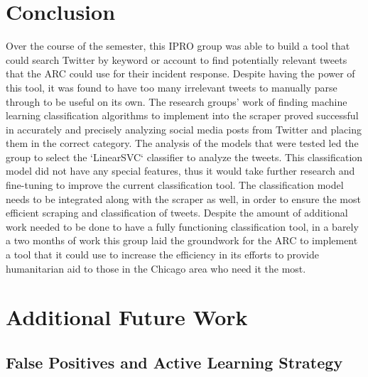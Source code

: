 \documentclass[titlepage, 12pt]{article}
\begin{document}
\section{Conclusion}
\hspace{0.5 cm}Over the course of the semester, this IPRO group was able to build a tool that could search Twitter by keyword or account to find potentially relevant tweets that the ARC could use for their incident response. Despite having the power of this tool, it was found to have too many irrelevant tweets to manually parse through to be useful on its own. The research groups' work of finding machine learning classification algorithms to implement into the scraper proved successful in accurately and precisely analyzing social media posts from Twitter and placing them in the correct category. The analysis of the models that were tested led the group to select the `LinearSVC` classifier to analyze the tweets. This classification model did not have any special features, thus it would take further research and fine-tuning to improve the current classification tool. The classification model needs to be integrated along with the scraper as well, in order to ensure the most efficient scraping and classification of tweets. Despite the amount of additional work needed to be done to have a fully functioning classification tool, in a barely a two months of work this group laid the groundwork for the ARC to implement a tool that it could use to increase the efficiency in its efforts to provide humanitarian aid to those in the Chicago area who need it the most.

\section{Additional Future Work}

\subsection{False Positives and Active Learning Strategy}
\end{document}
